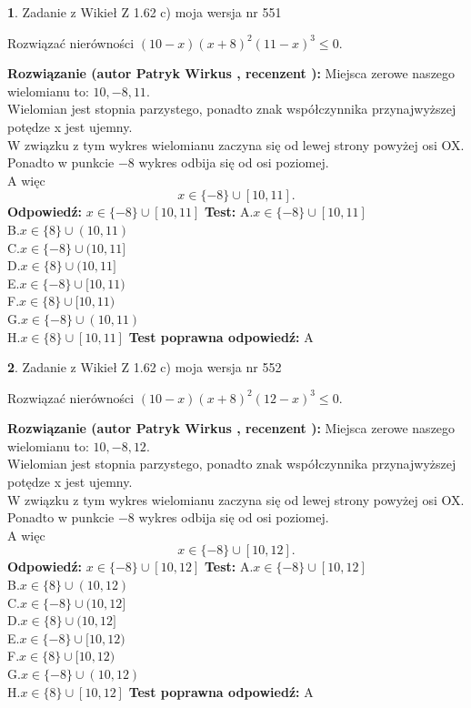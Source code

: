 \documentclass[12pt, a4paper]{article}
\theoremstyle{definition} %
\newtheorem{zad}{}
\newcommand{\zadStart}[1]{\begin{zad}#1\newline}
\newcommand{\zadStop}{\end{zad}}
\newcommand{\rozwStart}[2]{\noindent \textbf{Rozwiązanie (autor #1 , recenzent #2): }\newline}
\newcommand{\rozwStop}{\newline}
\newcommand{\odpStart}{\noindent \textbf{Odpowiedź:}\newline}
\newcommand{\odpStop}{\newline}
\newcommand{\testStart}{\noindent \textbf{Test:}\newline}
\newcommand{\testStop}{\newline}
\newcommand{\kluczStart}{\noindent \textbf{Test poprawna odpowiedź:}\newline}
\newcommand{\kluczStop}{\newline}
\begin{document}
\zadStart{Zadanie z Wikieł Z 1.62 c) moja wersja nr 551}

Rozwiązać nierówności $(10-x)(x+8)^{2}(11-x)^{3}\le0$.
\zadStop
\rozwStart{Patryk Wirkus}{}
Miejsca zerowe naszego wielomianu to: $10, -8, 11$.\\
Wielomian jest stopnia parzystego, ponadto znak współczynnika przy\linebreak najwyższej potędze x jest ujemny.\\ W związku z tym wykres wielomianu zaczyna się od lewej strony powyżej osi OX.\\
Ponadto w punkcie $-8$ wykres odbija się od osi poziomej.\\
A więc $$x \in \{-8\} \cup [10,11].$$
\rozwStop
\odpStart
$x \in \{-8\} \cup [10,11]$
\odpStop
\testStart
A.$x \in \{-8\} \cup [10,11]$\\
B.$x \in \{8\} \cup (10,11)$\\
C.$x \in \{-8\} \cup (10,11]$\\
D.$x \in \{8\} \cup (10,11]$\\
E.$x \in \{-8\} \cup [10,11)$\\
F.$x \in \{8\} \cup [10,11)$\\
G.$x \in \{-8\} \cup (10,11)$\\
H.$x \in \{8\} \cup [10,11]$
\testStop
\kluczStart
A
\kluczStop



\zadStart{Zadanie z Wikieł Z 1.62 c) moja wersja nr 552}

Rozwiązać nierówności $(10-x)(x+8)^{2}(12-x)^{3}\le0$.
\zadStop
\rozwStart{Patryk Wirkus}{}
Miejsca zerowe naszego wielomianu to: $10, -8, 12$.\\
Wielomian jest stopnia parzystego, ponadto znak współczynnika przy\linebreak najwyższej potędze x jest ujemny.\\ W związku z tym wykres wielomianu zaczyna się od lewej strony powyżej osi OX.\\
Ponadto w punkcie $-8$ wykres odbija się od osi poziomej.\\
A więc $$x \in \{-8\} \cup [10,12].$$
\rozwStop
\odpStart
$x \in \{-8\} \cup [10,12]$
\odpStop
\testStart
A.$x \in \{-8\} \cup [10,12]$\\
B.$x \in \{8\} \cup (10,12)$\\
C.$x \in \{-8\} \cup (10,12]$\\
D.$x \in \{8\} \cup (10,12]$\\
E.$x \in \{-8\} \cup [10,12)$\\
F.$x \in \{8\} \cup [10,12)$\\
G.$x \in \{-8\} \cup (10,12)$\\
H.$x \in \{8\} \cup [10,12]$
\testStop
\kluczStart
A
\kluczStop
\end{document}
